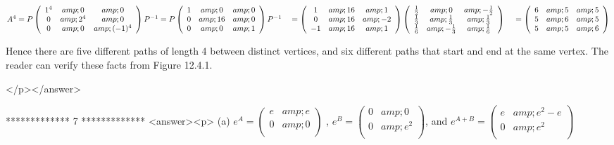 \(A^4= P \left(
\begin{array}{ccc}
 1^4 &amp; 0 &amp; 0 \\
 0 &amp; 2^4 &amp; 0 \\
 0 &amp; 0 &amp; (-1)^{4 } \\
\end{array}
\right)P^{-1}= P \left(
\begin{array}{ccc}
 1 &amp; 0 &amp; 0 \\
 0 &amp; 16 &amp; 0 \\
 0 &amp; 0 &amp; 1 \\
\end{array}
\right)P^{-1}\\
\\
\quad =\left(
\begin{array}{ccc}
 1 &amp; 16 &amp; 1 \\
 0 &amp; 16 &amp; -2 \\
 -1 &amp; 16 &amp; 1 \\
\end{array}
\right)\left(
\begin{array}{ccc}
 \frac{1}{2} &amp; 0 &amp; -\frac{1}{2} \\
 \frac{1}{3} &amp; \frac{1}{3} &amp; \frac{1}{3} \\
 \frac{1}{6} &amp; -\frac{1}{3} &amp; \frac{1}{6} \\
\end{array}
\right)\\
\\
\quad =\left(
\begin{array}{ccc}
 6 &amp; 5 &amp; 5 \\
 5 &amp; 6 &amp; 5 \\
 5 &amp; 5 &amp; 6 \\
\end{array}
\right)\)



Hence there are five different paths of length 4 between distinct vertices, and six different paths that start and end at the same vertex.  The
reader can verify these facts from Figure 12.4.1.

</p></answer>


*************
7
*************
<answer><p> (a)  \(e^A=\left(
\begin{array}{cc}
 e &amp; e \\
 0 &amp; 0 \\
\end{array}
\right)\) ,  \(e^B=\left(
\begin{array}{cc}
 0 &amp; 0 \\
 0 &amp; e^2 \\
\end{array}
\right)\),  and  \(e^{A+B}=\left(
\begin{array}{cc}
 e &amp; e^2-e \\
 0 &amp; e^2 \\
\end{array}
\right)\)

